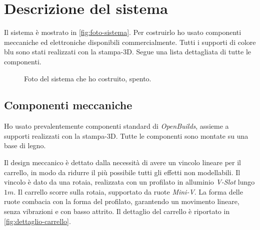 \section{Descrizione del sistema}
\label{sec:sistema-reale}
Il sistema è mostrato in \autoref{fig:foto-sistema}.
Per costruirlo ho usato componenti meccaniche ed elettroniche
disponibili commercialmente.
Tutti i supporti di colore blu sono stati
realizzati con la stampa-3D. Segue una lista dettagliata di tutte le componenti.

\begin{figure}[H]
    \centering
    \caption[Foto del sistema]{Foto del sistema che ho costruito, spento.}
    \label{fig:foto-sistema}
\end{figure}

\subsection{Componenti meccaniche}
\label{subsec:componenti-meccaniche}
Ho usato prevalentemente componenti standard di \emph{OpenBuilds},
assieme a supporti realizzati con la stampa-3D.
Tutte le componenti sono montate su una base di legno.

Il design meccanico è dettato dalla necessità di avere un vincolo
lineare per il carrello,
in modo da ridurre il più possibile tutti gli effetti non modellabili.
Il vincolo è dato da una rotaia, realizzata con un profilato in alluminio
\emph{V-Slot} lungo $1m$. Il carrello scorre sulla rotaia, supportato da
ruote \emph{Mini-V}. La forma delle ruote combacia con la forma del profilato, garantendo un movimento lineare, senza vibrazioni e con basso attrito.
Il dettaglio del carrello è riportato in \autoref{fig:dettaglio-carrello}.

